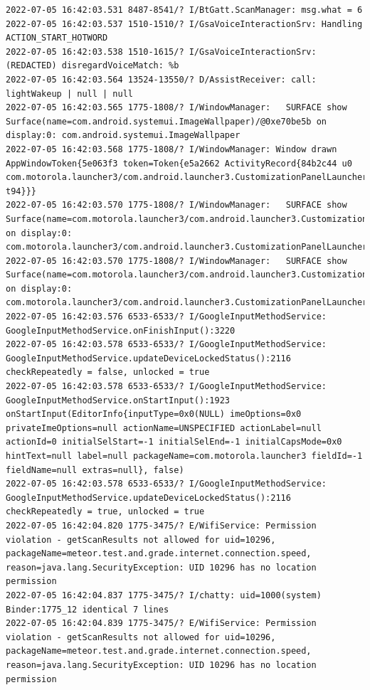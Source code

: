 \documentclass[a4paper,12pt]{book}
\begin{document}
\begin{lstlisting}
2022-07-05 16:42:03.531 8487-8541/? I/BtGatt.ScanManager: msg.what = 6
2022-07-05 16:42:03.537 1510-1510/? I/GsaVoiceInteractionSrv: Handling ACTION_START_HOTWORD
2022-07-05 16:42:03.538 1510-1615/? I/GsaVoiceInteractionSrv: (REDACTED) disregardVoiceMatch: %b
2022-07-05 16:42:03.564 13524-13550/? D/AssistReceiver: call: lightWakeup | null | null
2022-07-05 16:42:03.565 1775-1808/? I/WindowManager:   SURFACE show Surface(name=com.android.systemui.ImageWallpaper)/@0xe70be5b on display:0: com.android.systemui.ImageWallpaper
2022-07-05 16:42:03.568 1775-1808/? I/WindowManager: Window drawn AppWindowToken{5e063f3 token=Token{e5a2662 ActivityRecord{84b2c44 u0 com.motorola.launcher3/com.android.launcher3.CustomizationPanelLauncher t94}}}
2022-07-05 16:42:03.570 1775-1808/? I/WindowManager:   SURFACE show Surface(name=com.motorola.launcher3/com.android.launcher3.CustomizationPanelLauncher)/@0xc19a52c on display:0: com.motorola.launcher3/com.android.launcher3.CustomizationPanelLauncher
2022-07-05 16:42:03.570 1775-1808/? I/WindowManager:   SURFACE show Surface(name=com.motorola.launcher3/com.android.launcher3.CustomizationPanelLauncher)/@0x346ebf5 on display:0: com.motorola.launcher3/com.android.launcher3.CustomizationPanelLauncher
2022-07-05 16:42:03.576 6533-6533/? I/GoogleInputMethodService: GoogleInputMethodService.onFinishInput():3220 
2022-07-05 16:42:03.578 6533-6533/? I/GoogleInputMethodService: GoogleInputMethodService.updateDeviceLockedStatus():2116 checkRepeatedly = false, unlocked = true
2022-07-05 16:42:03.578 6533-6533/? I/GoogleInputMethodService: GoogleInputMethodService.onStartInput():1923 onStartInput(EditorInfo{inputType=0x0(NULL) imeOptions=0x0 privateImeOptions=null actionName=UNSPECIFIED actionLabel=null actionId=0 initialSelStart=-1 initialSelEnd=-1 initialCapsMode=0x0 hintText=null label=null packageName=com.motorola.launcher3 fieldId=-1 fieldName=null extras=null}, false)
2022-07-05 16:42:03.578 6533-6533/? I/GoogleInputMethodService: GoogleInputMethodService.updateDeviceLockedStatus():2116 checkRepeatedly = true, unlocked = true
2022-07-05 16:42:04.820 1775-3475/? E/WifiService: Permission violation - getScanResults not allowed for uid=10296, packageName=meteor.test.and.grade.internet.connection.speed, reason=java.lang.SecurityException: UID 10296 has no location permission
2022-07-05 16:42:04.837 1775-3475/? I/chatty: uid=1000(system) Binder:1775_12 identical 7 lines
2022-07-05 16:42:04.839 1775-3475/? E/WifiService: Permission violation - getScanResults not allowed for uid=10296, packageName=meteor.test.and.grade.internet.connection.speed, reason=java.lang.SecurityException: UID 10296 has no location permission

\end{lstlisting}
\end{document}
